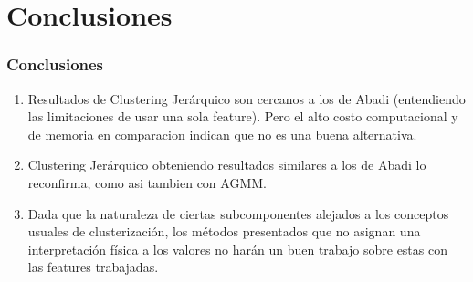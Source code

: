 \section{Conclusiones}


\begin{frame}
\frametitle{Conclusiones}

\begin{enumerate}
    \item<2-> Resultados de Clustering Jerárquico son cercanos a los de Abadi (entendiendo las limitaciones de usar una sola feature). Pero el alto costo computacional y de memoria en comparacion indican que no es una buena alternativa.
    \item<3-> Clustering Jerárquico obteniendo resultados similares a los de Abadi lo reconfirma, como asi tambien con AGMM.
    \item<4-> Dada que la naturaleza de ciertas subcomponentes alejados a los conceptos usuales de clusterización, los métodos presentados que no asignan una interpretación física a los valores no harán un buen trabajo sobre estas con las features trabajadas.
\end{enumerate}


\end{frame}






